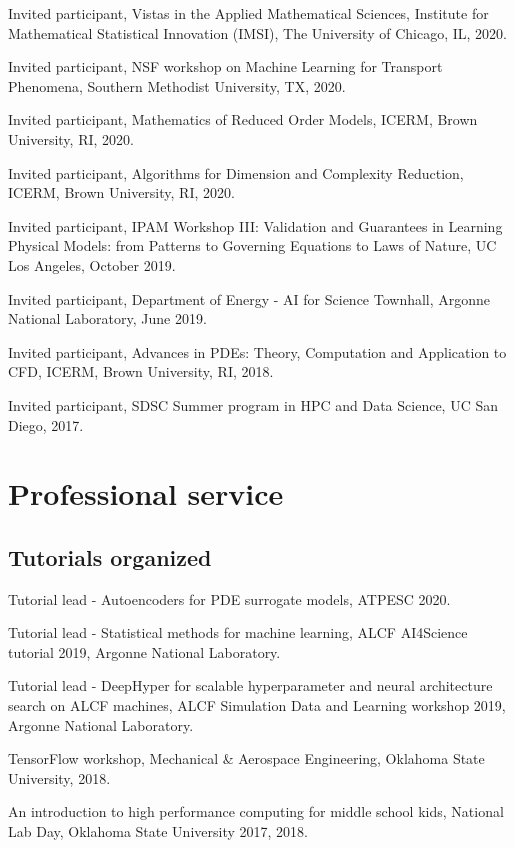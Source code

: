 \documentclass[letterpaper]{article}
\renewenvironment{itemize}{
  \begin{list}{}{
    \setlength{\leftmargin}{1.5em}
  }
}{
  \end{list}
}
\begin{document}
\begin{itemize}
    \item Invited participant, Vistas in the Applied Mathematical Sciences, Institute for Mathematical Statistical Innovation (IMSI),  The University of Chicago, IL, 2020.

    \item Invited participant, NSF workshop on Machine Learning for Transport Phenomena, Southern Methodist University, TX, 2020.

    \item Invited participant, Mathematics of Reduced Order Models, ICERM, Brown University, RI, 2020.

    \item Invited participant, Algorithms for Dimension and Complexity Reduction, ICERM, Brown University, RI, 2020.

    \item Invited participant, IPAM Workshop III: Validation and Guarantees in Learning Physical Models: from Patterns to Governing Equations to Laws of Nature, UC Los Angeles, October 2019.
    
    \item Invited participant, Department of Energy - AI for Science Townhall, Argonne National Laboratory, June 2019.
    
    \item Invited participant, Advances in PDEs: Theory, Computation and Application to CFD, ICERM, Brown University, RI, 2018.
    
    \item Invited participant, SDSC Summer program in HPC and Data Science, UC San Diego, 2017.
\end{itemize}

\section*{Professional service}

\subsection*{Tutorials organized}

\begin{itemize}
  \item Tutorial lead - Autoencoders for PDE surrogate models, ATPESC 2020.
  \item Tutorial lead - Statistical methods for machine learning, ALCF AI4Science tutorial 2019, Argonne National Laboratory.
  \item Tutorial lead - DeepHyper for scalable hyperparameter and neural architecture search on ALCF machines, ALCF Simulation Data and Learning workshop 2019, Argonne National Laboratory.
  \item TensorFlow workshop, Mechanical \& Aerospace Engineering, Oklahoma State University, 2018.
  \item An introduction to high performance computing for middle school kids, National Lab Day, Oklahoma State University 2017, 2018.
\end{itemize}
\end{document}
